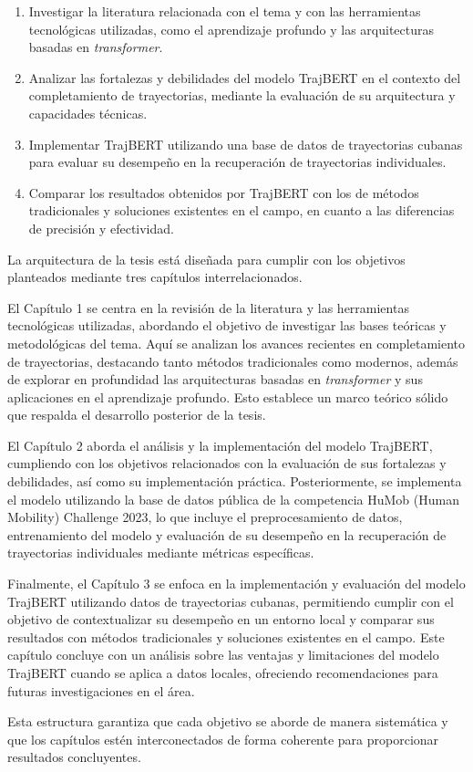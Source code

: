 \begin{enumerate}
    \item Investigar la literatura relacionada con el tema y con las herramientas tecnológicas utilizadas, como el aprendizaje profundo y las arquitecturas basadas en \textit{transformer}.
    \item Analizar las fortalezas y debilidades del modelo TrajBERT en el contexto del completamiento de trayectorias, mediante la evaluación de su arquitectura y capacidades técnicas.
    \item Implementar TrajBERT utilizando una base de datos de trayectorias cubanas para evaluar su desempeño en la recuperación de trayectorias individuales.
    \item Comparar los resultados obtenidos por TrajBERT con los de métodos tradicionales y soluciones existentes en el campo, en cuanto a las diferencias de precisión y efectividad.
\end{enumerate}

La arquitectura de la tesis está diseñada para cumplir con los objetivos planteados mediante tres capítulos interrelacionados.

El Capítulo 1 se centra en la revisión de la literatura y las herramientas tecnológicas utilizadas, abordando el objetivo de investigar las bases teóricas y metodológicas del tema. Aquí se analizan los avances recientes en completamiento de trayectorias, destacando tanto métodos tradicionales como modernos, además de explorar en profundidad las arquitecturas basadas en \textit{transformer} y sus aplicaciones en el aprendizaje profundo. Esto establece un marco teórico sólido que respalda el desarrollo posterior de la tesis.

El Capítulo 2 aborda el análisis y la implementación del modelo TrajBERT, cumpliendo con los objetivos relacionados con la evaluación de sus fortalezas y debilidades, así como su implementación práctica. Posteriormente, se implementa el modelo utilizando la base de datos pública de la competencia HuMob (Human Mobility) Challenge 2023, lo que incluye el preprocesamiento de datos, entrenamiento del modelo y evaluación de su desempeño en la recuperación de trayectorias individuales mediante métricas específicas.

Finalmente, el Capítulo 3 se enfoca en la implementación y evaluación del modelo TrajBERT utilizando datos de trayectorias cubanas, permitiendo cumplir con el objetivo de contextualizar su desempeño en un entorno local y comparar sus resultados con métodos tradicionales y soluciones existentes en el campo. Este capítulo concluye con un análisis sobre las ventajas y limitaciones del modelo TrajBERT cuando se aplica a datos locales, ofreciendo recomendaciones para futuras investigaciones en el área.

Esta estructura garantiza que cada objetivo se aborde de manera sistemática y que los capítulos estén interconectados de forma coherente para proporcionar resultados concluyentes.